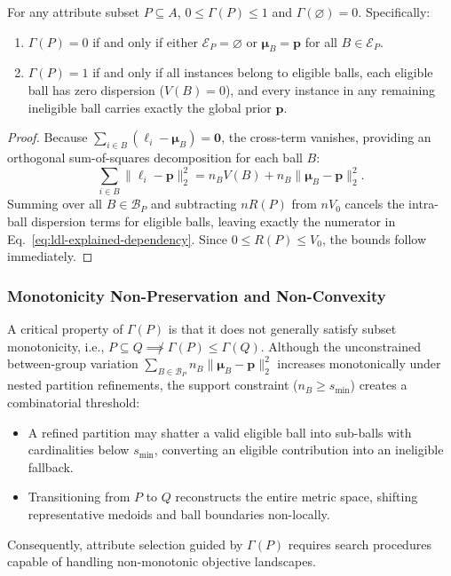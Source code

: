 \begin{proposition}
	\label{prop:variance-bounds}
	For any attribute subset $P \subseteq A$, $0 \le \Gamma(P) \le 1$ and $\Gamma(\varnothing) = 0$. Specifically:
\begin{enumerate}[label=(\roman*)]
		\item $\Gamma(P) = 0$ if and only if either $\mathcal{E}_P = \varnothing$ or $\boldsymbol{\mu}_B = \boldsymbol{p}$ for all $B \in \mathcal{E}_P$.
		\item $\Gamma(P) = 1$ if and only if all instances belong to eligible balls, each eligible ball has zero dispersion ($V(B)=0$), and every instance in any remaining ineligible ball carries exactly the global prior $\boldsymbol{p}$.
	\end{enumerate}
\end{proposition}
\begin{proof}
	Because $\sum_{i \in B}(\boldsymbol{\ell}_i - \boldsymbol{\mu}_B) = \mathbf{0}$, the cross-term vanishes, providing an orthogonal sum-of-squares decomposition for each ball $B$:
	\begin{equation}
		\sum_{i \in B} \|\boldsymbol{\ell}_i - \boldsymbol{p}\|_2^2 = n_B V(B) + n_B \|\boldsymbol{\mu}_B - \boldsymbol{p}\|_2^2.
		\label{eq:ball-variance-decomposition}
	\end{equation}
	Summing over all $B \in \mathcal{B}_P$ and subtracting $n R(P)$ from $n V_0$ cancels the intra-ball dispersion terms for eligible balls, leaving exactly the numerator in Eq.~\eqref{eq:ldl-explained-dependency}. Since $0 \le R(P) \le V_0$, the bounds follow immediately.
\end{proof}

\subsubsection{Monotonicity Non-Preservation and Non-Convexity}
A critical property of $\Gamma(P)$ is that it does not generally satisfy subset monotonicity, i.e., $P \subseteq Q \not\implies \Gamma(P) \le \Gamma(Q)$. 
Although the unconstrained between-group variation $\sum_{B \in \mathcal{B}_P} n_B \|\boldsymbol{\mu}_B - \boldsymbol{p}\|_2^2$ increases monotonically under nested partition refinements, the support constraint ($n_B \ge s_{\min}$) creates a combinatorial threshold:
\begin{itemize}
	\item A refined partition may shatter a valid eligible ball into sub-balls with cardinalities below $s_{\min}$, converting an eligible contribution into an ineligible fallback.
	\item Transitioning from $P$ to $Q$ reconstructs the entire metric space, shifting representative medoids and ball boundaries non-locally.
\end{itemize}
Consequently, attribute selection guided by $\Gamma(P)$ requires search procedures capable of handling non-monotonic objective landscapes.

